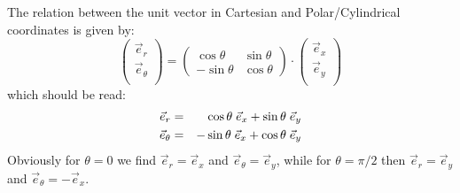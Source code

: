 \noindent The relation between the unit vector in Cartesian and Polar/Cylindrical coordinates
is given by:
\[
\left(
\begin{array}{c}
{\vec e}_{r} \\
{\vec e}_{\theta} \\
\end{array}
\right)
=
\left(
\begin{array}{cc}
\cos \theta & \sin \theta \\
-\sin \theta & \cos \theta
\end{array}
\right)
\cdot
\left(
\begin{array}{c}
{\vec e}_{x} \\
{\vec e}_{y} \\
\end{array}
\right)
\]
which should be read:
\begin{eqnarray}
{\vec e}_{r}      &=& \cos\theta \; {\vec e}_{x} + \sin\theta \;  {\vec e}_{y} \nonumber\\
{\vec e}_{\theta} &=& -\sin\theta \; {\vec e}_{x} + \cos\theta \;  {\vec e}_{y} 
\end{eqnarray}
Obviously for $\theta=0$ we find $\vec{e}_r=\vec{e}_x$ and $\vec{e}_\theta = \vec{e}_y$, 
while for $\theta=\pi/2$ then $\vec{e}_r=\vec{e}_y$ and $\vec{e}_\theta=-\vec{e}_x$.


